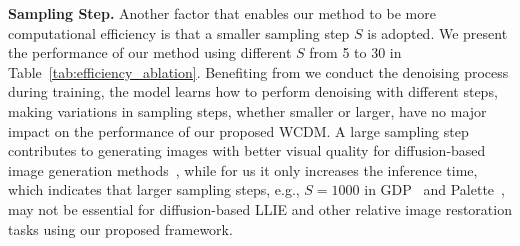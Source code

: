 \textbf{Sampling Step.} Another factor that enables our method to be more computational efficiency is that a smaller sampling step $S$ is adopted. We present the performance of our method using different $S$ from 5 to 30 in Table~\ref{tab:efficiency_ablation}. Benefiting from we conduct the denoising process during training, the model learns how to perform denoising with different steps, making variations in sampling steps, whether smaller or larger, have no major impact on the performance of our proposed WCDM. A large sampling step contributes to generating images with better visual quality for diffusion-based image generation methods~\cite{ddpm,ddim}, while for us it only increases the inference time, which indicates that larger sampling steps, e.g., $S=1000$ in GDP~\cite{GDP} and Palette~\cite{palette}, may not be essential for diffusion-based LLIE and other relative image restoration tasks using our proposed framework.

